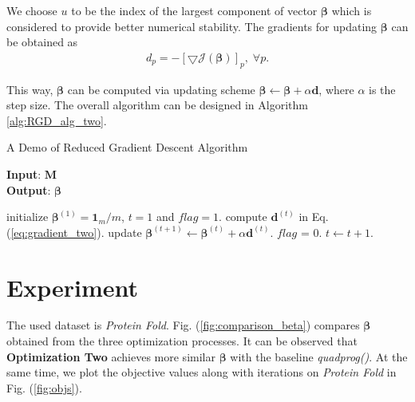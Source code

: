 \documentclass{article}
\begin{document}
We choose $u$ to be the index of the largest component of vector $\boldsymbol{\beta}$ which is considered to provide better numerical stability.
The gradients for updating $\boldsymbol{\beta}$ can be obtained as 
\begin{equation}\label{eq:gradient_two}
	\begin{split}
		d_p = - [\bigtriangledown \mathcal{J}(\boldsymbol{\beta})]_p,\; \forall p.
	\end{split}
\end{equation}


This way, $\boldsymbol{\beta}$ can be computed via updating scheme $\boldsymbol{\beta} \leftarrow \boldsymbol{\beta} + \alpha \mathbf{d}$, where $\alpha$ is the step size.
The overall algorithm can be designed in Algorithm \ref{alg:RGD_alg_two}.


\begin{algorithm}[h]
\caption{A Demo of Reduced Gradient Descent Algorithm}
\label{alg:RGD_alg_two}
\textbf{Input}: $\mathbf{M}$\\
\textbf{Output}: $\boldsymbol{\beta}$
\begin{algorithmic}[1] %
\STATE initialize $\boldsymbol{\beta}^{(1)}=\mathbf{1}_m/m$, $t=1$ and $flag=1$.
  \STATE compute $\mathbf{d}^{(t)}$ in Eq. (\ref{eq:gradient_two}).
  \STATE update $\boldsymbol{\beta}^{(t+1)} \leftarrow \boldsymbol{\beta}^{(t)} + \alpha \mathbf{d}^{(t)}$.
  		\STATE $flag$ = 0.
  \ENDIF
  \STATE $t \leftarrow t+1$.
\ENDWHILE
\end{algorithmic}
\end{algorithm}



\section{Experiment}

The used dataset is \emph{Protein Fold}.
Fig. (\ref{fig:comparison_beta}) compares $\boldsymbol{\beta}$ obtained from the three optimization processes. 
It can be observed that \textbf{Optimization Two} achieves more similar $\boldsymbol{\beta}$ with the baseline \emph{quadprog()}.
At the same time, we plot the objective values along with iterations on \emph{Protein Fold} in Fig. (\ref{fig:objs}).
\end{document}
